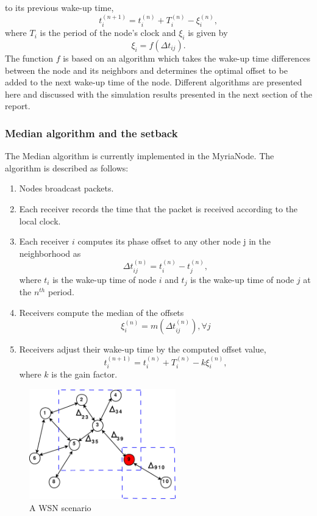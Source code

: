 \documentclass[journal]{IEEEtran}
\begin{document}
to its previous wake-up time,
\begin{equation}
t_i^{(n+1)} = t_i^{(n)} + T_i^{(n)} - \xi_i^{(n)} ,
\end{equation}
where $T_i$ is the period of the node's clock and $\xi_i$ is given
by
\begin{equation}
\xi_i = f(\Delta t_{ij}).
\end{equation}
The function $f$ is based on an algorithm which takes the wake-up
time differences between the node and its neighbors and determines
the optimal offset to be added to the next wake-up time of the node.
\newline Different algorithms are presented here and discussed with the
simulation results presented in the next section of the report.\newline
\subsubsection{\textbf{Median algorithm and the setback}}
The Median algorithm is currently implemented in the MyriaNode.
The algorithm is described as follows:
\begin{enumerate}
\item Nodes broadcast packets.
\item Each receiver records the time that the packet is received according to the local clock.
\item Each receiver $i$ computes its phase offset to
any other node j in the neighborhood as 
\begin{equation}
\Delta t_{ij}^{(n)} = t_i^{(n)} - t_j^{(n)} ,
\end{equation}
where $t_i$ is the wake-up time of node $i$ and $t_j$ is the wake-up
time of node $j$ at the $n^{th}$ period.
\item Receivers compute the median of the offsets
\begin{equation}
\xi_i^{(n)} = m(\Delta t_{ij}^{(n)}) , \forall j
\end{equation}
\item Receivers adjust their wake-up time by the computed offset value,
\begin{equation}
t_{i}^{(n+1)} = t_i^{(n)} + T_i^{(n)} - k\xi_i^{(n)},
\end{equation}
where $k$ is the gain factor.
\end{enumerate}
\begin{figure}[b]
\centering
\includegraphics[width=2.5in]{node_field}
\caption{A WSN scenario} \label{wsn}
\end{figure}
\end{document}
